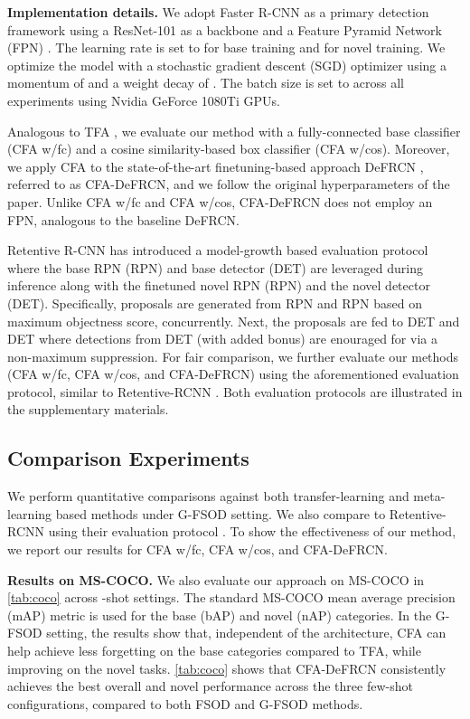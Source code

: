 \documentclass[10pt,twocolumn,letterpaper]{article}
\begin{document}
\textbf{Implementation details.} We adopt Faster R-CNN \cite{FasterR-CNN} as a primary detection framework using a ResNet-101 \cite{resnets} as a backbone and a Feature Pyramid Network (FPN) \cite{fpn}. The learning rate is set to  for base training and  for novel training.  We optimize the model with a stochastic gradient descent (SGD) optimizer using a momentum of  and a weight decay of . The batch size is set to  across all experiments using  Nvidia GeForce 1080Ti GPUs. 

Analogous to TFA \cite{TFA}, we evaluate our method with a fully-connected base classifier (CFA w/fc) and a cosine similarity-based box classifier (CFA w/cos). Moreover, we apply CFA to the state-of-the-art finetuning-based approach DeFRCN \cite{defrcn}, referred to as CFA-DeFRCN, and we follow the original  hyperparameters of the paper. Unlike CFA w/fc and CFA w/cos, CFA-DeFRCN does not employ an FPN, analogous to the baseline DeFRCN. 

Retentive R-CNN \cite{gfsod} has introduced a model-growth based evaluation protocol where the base RPN (RPN) and base detector (DET) are leveraged during inference along with the finetuned novel RPN (RPN) and the novel detector (DET). Specifically, proposals are generated from RPN and RPN based on maximum objectness score, concurrently. Next, the proposals are fed to DET and DET where detections from DET (with added  bonus) are enouraged for  via a non-maximum suppression. For fair comparison, we further evaluate our methods (CFA w/fc, CFA w/cos, and CFA-DeFRCN) using the aforementioned evaluation protocol, similar to Retentive-RCNN \cite{gfsod}. Both evaluation protocols are illustrated in the supplementary materials.


\subsection{Comparison Experiments}

We perform quantitative comparisons against both transfer-learning \cite{TFA, MPSR, gfsod, defrcn} and meta-learning \cite{ONCE, MetaRCNN, FSRW, FsDetView} based methods under G-FSOD setting. We also compare to Retentive-RCNN using their evaluation protocol \cite{gfsod}. To show the effectiveness of our method, we report our results for CFA w/fc, CFA w/cos, and CFA-DeFRCN.  

\textbf{Results on MS-COCO.} We also evaluate our approach on MS-COCO in \cref{tab:coco} across -shot settings. The standard MS-COCO mean average precision (mAP) metric is used for the base (bAP) and novel (nAP) categories. In the G-FSOD setting, the results show that, independent of the architecture, CFA can help achieve less forgetting on the base categories compared to TFA, while improving on the novel tasks. \cref{tab:coco} shows that CFA-DeFRCN consistently achieves the best overall and novel performance across the three few-shot configurations, compared to both FSOD and G-FSOD methods. 
\end{document}
